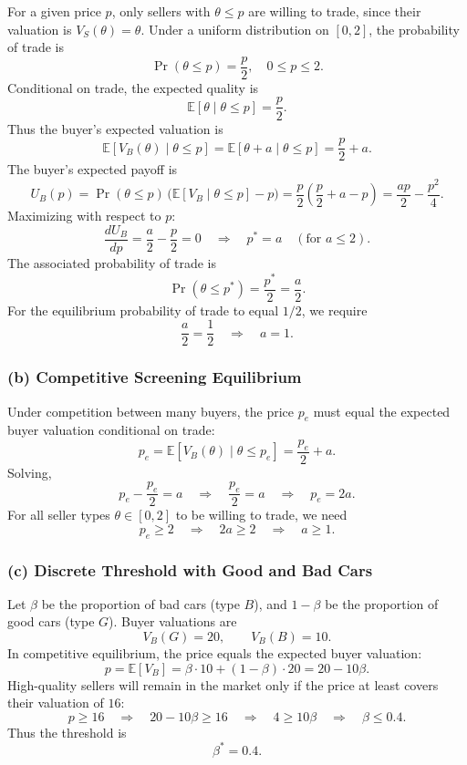 \documentclass[12pt,a4paper]{article}
\begin{document}
For a given price \(p\), only sellers with \(\theta \le p\) are willing to trade, since
their valuation is \(V_S(\theta) = \theta\). Under a uniform distribution on \([0,2]\), the
probability of trade is
\[
  \Pr(\theta \le p) = \frac{p}{2}, \quad 0 \le p \le 2.
\]
Conditional on trade, the expected quality is
\[
  \mathbb{E}[\theta \mid \theta \le p] = \frac{p}{2}.
\]
Thus the buyer's expected valuation is
\[
  \mathbb{E}[V_B(\theta) \mid \theta \le p]
  = \mathbb{E}[\theta + a \mid \theta \le p]
  = \frac{p}{2} + a.
\]
The buyer's expected payoff is
\[
  U_B(p) = \Pr(\theta \le p)\,\bigl(\mathbb{E}[V_B \mid \theta \le p] - p\bigr)
         = \frac{p}{2} \left(\frac{p}{2} + a - p\right)
         = \frac{ap}{2} - \frac{p^2}{4}.
\]
Maximizing with respect to \(p\):
\[
  \frac{dU_B}{dp} = \frac{a}{2} - \frac{p}{2} = 0
  \quad\Longrightarrow\quad
  p^* = a \quad (\text{for } a \le 2).
\]
The associated probability of trade is
\[
  \Pr(\theta \le p^*) = \frac{p^*}{2} = \frac{a}{2}.
\]
For the equilibrium probability of trade to equal \(1/2\), we require
\[
  \frac{a}{2} = \frac{1}{2} \quad\Longrightarrow\quad a = 1.
\]

\subsubsection*{(b) Competitive Screening Equilibrium}

Under competition between many buyers, the price \(p_e\) must equal the expected buyer valuation
conditional on trade:
\[
  p_e = \mathbb{E}[V_B(\theta) \mid \theta \le p_e]
      = \frac{p_e}{2} + a.
\]
Solving,
\[
  p_e - \frac{p_e}{2} = a
  \quad\Longrightarrow\quad
  \frac{p_e}{2} = a
  \quad\Longrightarrow\quad
  p_e = 2a.
\]
For all seller types \(\theta \in [0,2]\) to be willing to trade, we need
\[
  p_e \ge 2
  \quad\Longrightarrow\quad
  2a \ge 2
  \quad\Longrightarrow\quad
  a \ge 1.
\]

\subsubsection*{(c) Discrete Threshold with Good and Bad Cars}

Let \(\beta\) be the proportion of bad cars (type \(B\)), and \(1-\beta\) be the proportion of good
cars (type \(G\)). Buyer valuations are
\[
  V_B(G) = 20, \qquad V_B(B) = 10.
\]
In competitive equilibrium, the price equals the expected buyer valuation:
\[
  p = \mathbb{E}[V_B]
    = \beta \cdot 10 + (1-\beta)\cdot 20
    = 20 - 10\beta.
\]
High-quality sellers will remain in the market only if the price at least covers their valuation
of \(16\):
\[
  p \ge 16
  \quad\Longrightarrow\quad
  20 - 10\beta \ge 16
  \quad\Longrightarrow\quad
  4 \ge 10\beta
  \quad\Longrightarrow\quad
  \beta \le 0.4.
\]
Thus the threshold is
\[
  \beta^* = 0.4.
\]
\end{document}
